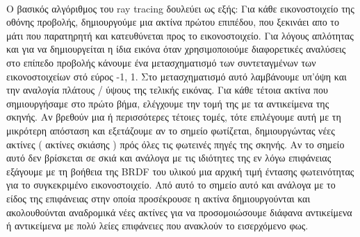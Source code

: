 \begin{sloppypar}
\paragraph{}
	O βασικός αλγόριθμος του ray tracing δουλεύει ως εξής: Για κάθε εικονοστοιχείο της οθόνης προβολής, δημιουργούμε μια ακτίνα
πρώτου επιπέδου, που ξεκινάει απο το μάτι που παρατηρητή και κατευθύνεται προς το εικονοστοιχείο. Για λόγους απλότητας και για να
δημιουργείται η ίδια εικόνα όταν χρησιμοποιούμε διαφορετικές αναλύσεις στο επίπεδο προβολής κάνουμε ένα μετασχηματισμό των 
συντεταγμένων των εικονοστοιχείων στό εύρος -1, 1. Στο μετασχηματισμό αυτό λαμβάνουμε υπ'όψη και την αναλογία πλάτους / ύψους της
τελικής εικόνας. Για κάθε τέτοια ακτίνα που σημιουργήσαμε στο πρώτο βήμα, ελέγχουμε την τομή της με τα αντικείμενα της σκηνής. Αν 
βρεθούν μια ή περισσότερες τέτοιες τομές, τότε επιλέγουμε αυτή με τη μικρότερη απόσταση και εξετάζουμε αν το σημείο φωτίζεται, 
δημιουργώντας νέες ακτίνες ( ακτίνες σκιάσης ) πρός όλες τις φωτεινές πηγές της σκηνής. Αν το σημείο αυτό δεν βρίσκεται
σε σκιά και ανάλογα με τις ιδιότητες της εν λόγω επιφάνειας εξάγουμε με τη βοήθεια της BRDF του υλικού μια αρχική τιμή έντασης 
φωτεινότητας για το συγκεκριμένο εικονοστοιχείο. Από αυτό το σημείο αυτό και ανάλογα με το είδος της επιφάνειας στην οποία προσέκρουσε 
η ακτίνα δημιουργούνται και ακολουθούνται αναδρομικά νέες ακτίνες για να προσομοιώσουμε διάφανα αντικείμενα ή αντικείμενα με πολύ λείες 
επιφάνειες που ανακλούν το εισερχόμενο φως.

\end{sloppypar}
